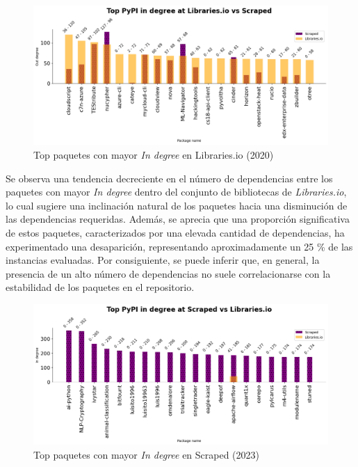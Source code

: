 \begin{figure}[ht!]
    \begin{center}
        \includegraphics[width=1\textwidth]{img/pypi/libio_t20_ind_comparison.png}
        \caption{Top paquetes con mayor \textit{In degree} en Libraries.io (2020)}
        \label{fig:pypi_libio_ind_comparison}
    \end{center}
\end{figure}

Se observa una tendencia decreciente en el número de dependencias entre los paquetes con mayor \textit{In degree}
dentro del conjunto de bibliotecas de \textit{Libraries.io}, lo cual sugiere una inclinación natural de los
paquetes hacia una disminución de las dependencias requeridas. Además, se aprecia que una proporción significativa
de estos paquetes, caracterizados por una elevada cantidad de dependencias, ha experimentado una desaparición,
representando aproximadamente un 25 \% de las instancias evaluadas. Por consiguiente, se puede inferir que,
en general, la presencia de un alto número de dependencias no suele correlacionarse con la estabilidad de
los paquetes en el repositorio.

\begin{figure}[ht!]
    \begin{center}
        \includegraphics[width=1\textwidth]{img/pypi/scraped_t20_ind_comparison.png}
        \caption{Top paquetes con mayor \textit{In degree} en Scraped (2023)}
        \label{fig:pypi_scraped_ind_comparison}
    \end{center}
\end{figure}

